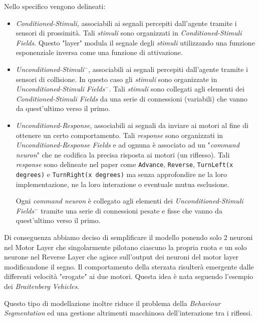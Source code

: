 Nello specifico vengono delineati:

\begin{itemize}
    \item \textit{Conditioned-Stimuli}, associabili ai segnali percepiti dall'agente tramite i sensori di prossimità. Tali \textit{stimuli} sono organizzati in \textit{Conditioned-Stimuli Fields}. Questo "layer" modula il segnale degli \textit{stimuli} utilizzando una funzione esponenziale inversa come una funzione di attivazione.
    
    \item \textit{Unconditioned-Stimuli$^-$}, associabili ai segnali percepiti dall'agente tramite i sensori di collisione. In questo caso gli \textit{stimuli} sono organizzate in \textit{Unconditioned-Stimuli Fields$^-$}. Tali \textit{stimuli} sono collegati agli elementi dei \textit{Conditioned-Stimuli Fields} da una serie di connessioni (variabili) che vanno da quest'ultimo verso il primo.
    
    \item \textit{Unconditioned-Response}, associabili ai segnali da inviare ai motori al fine di ottenere un certo comportamento. Tali \textit{response} sono organizzati in \textit{Unconditioned-Response Fields} e ad ognuna è associato ad un "\textit{command neuron}" che ne codifica la precisa risposta ai motori (un riflesso). Tali \textit{response} sono delineate nel paper come \texttt{Advance}, \texttt{Reverse}, \texttt{TurnLeft(x degrees)} e \texttt{TurnRight(x degrees)} ma senza approfondire ne la loro implementazione, ne la loro interazione o eventuale mutua esclusione.
    
    Ogni \textit{command neuron} è collegato agli elementi dei \textit{Unconditioned-Stimuli Fields$^-$} tramite una serie di connessioni pesate e fisse che vanno da quest'ultimo verso il primo.
\end{itemize}  

Di conseguenza abbiamo deciso di semplificare il modello ponendo solo 2 neuroni nel Motor Layer che singolarmente pilotano ciascuno la propria ruota e un solo neurone nel Reverse Layer che agisce sull'output dei neuroni del motor layer modificandone il segno.
Il comportamento della sterzata risulterà emergente dalle differenti velocità "erogate" ai due motori.
Questa idea è nata seguendo l'esempio dei \textit{Braitenberg Vehicles}.

Questo tipo di modellazione inoltre riduce il problema della \textit{Behaviour Segmentation} ed una gestione altrimenti macchinosa dell'interazione tra i riflessi.


